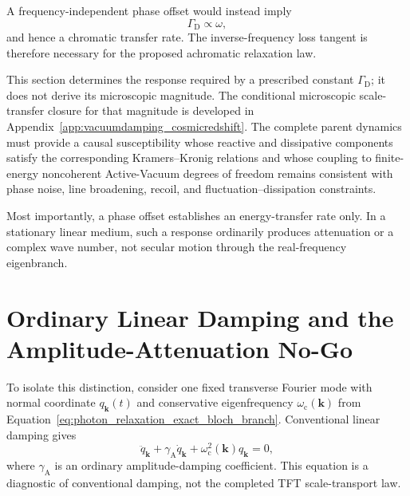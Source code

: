 A frequency-independent phase offset would instead imply
\begin{equation}
    \Gamma_{\mathrm D}
    \propto
    \omega,
    \label{eq:photon_relaxation_constant_phase_chromatic}
\end{equation}
and hence a chromatic transfer rate. The inverse-frequency loss tangent is
therefore necessary for the proposed achromatic relaxation law.

This section determines the response required by a prescribed constant
\(\Gamma_{\mathrm D}\); it does not derive its microscopic magnitude. The
conditional microscopic scale-transfer closure for that magnitude is
developed in Appendix~\ref{app:vacuumdamping_cosmicredshift}. The complete
parent dynamics must provide a causal susceptibility whose reactive and
dissipative components satisfy the corresponding Kramers--Kronig relations
and whose coupling to finite-energy noncoherent Active-Vacuum degrees of
freedom remains consistent with phase noise, line broadening, recoil, and
fluctuation--dissipation constraints.

Most importantly, a phase offset establishes an energy-transfer rate only.
In a stationary linear medium, such a response ordinarily produces
attenuation or a complex wave number, not secular motion through the
real-frequency eigenbranch.


\section{Ordinary Linear Damping and the Amplitude-Attenuation No-Go}
\label{sec:photon_relaxation_attenuation_no_go}

To isolate this distinction, consider one fixed transverse Fourier mode with
normal coordinate \(q_{\mathbf k}(t)\) and conservative eigenfrequency
\(\omega_{\mathrm c}(\mathbf k)\) from
Equation~\eqref{eq:photon_relaxation_exact_bloch_branch}. Conventional
linear damping gives
\begin{equation}
    \ddot q_{\mathbf k}
    +
    \gamma_{\mathrm A}
    \dot q_{\mathbf k}
    +
    \omega_{\mathrm c}^{2}(\mathbf k)
    q_{\mathbf k}
    =
    0,
    \label{eq:photon_relaxation_linearly_damped_mode}
\end{equation}
where \(\gamma_{\mathrm A}\) is an ordinary amplitude-damping coefficient.
This equation is a diagnostic of conventional damping, not the completed
TFT scale-transport law.

